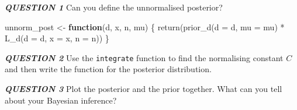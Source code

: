 \documentclass[
]{article}
\newenvironment{Shaded}{\begin{snugshade}}{\end{snugshade}}
\newcommand{\AttributeTok}[1]{\textcolor[rgb]{0.77,0.63,0.00}{#1}}
\newcommand{\ConstantTok}[1]{\textcolor[rgb]{0.00,0.00,0.00}{#1}}
\newcommand{\ControlFlowTok}[1]{\textcolor[rgb]{0.13,0.29,0.53}{\textbf{#1}}}
\newcommand{\DecValTok}[1]{\textcolor[rgb]{0.00,0.00,0.81}{#1}}
\newcommand{\FloatTok}[1]{\textcolor[rgb]{0.00,0.00,0.81}{#1}}
\newcommand{\FunctionTok}[1]{\textcolor[rgb]{0.00,0.00,0.00}{#1}}
\newcommand{\NormalTok}[1]{#1}
\newcommand{\OtherTok}[1]{\textcolor[rgb]{0.56,0.35,0.01}{#1}}
\newcommand{\SpecialCharTok}[1]{\textcolor[rgb]{0.00,0.00,0.00}{#1}}
\begin{document}
\emph{\textbf{QUESTION 1}} Can you define the unnormalised posterior?

\begin{Shaded}
\begin{Highlighting}[]
\NormalTok{unnorm\_post }\OtherTok{\textless{}{-}} \ControlFlowTok{function}\NormalTok{(d, x, n, mu)}
\NormalTok{\{}
  \FunctionTok{return}\NormalTok{(}\FunctionTok{prior\_d}\NormalTok{(}\AttributeTok{d =}\NormalTok{ d, }\AttributeTok{mu =}\NormalTok{ mu) }\SpecialCharTok{*} \FunctionTok{L\_d}\NormalTok{(}\AttributeTok{d =}\NormalTok{ d, }\AttributeTok{x =}\NormalTok{ x, }\AttributeTok{n =}\NormalTok{ n))}
\NormalTok{\}}
\end{Highlighting}
\end{Shaded}

\emph{\textbf{QUESTION 2}} Use the \texttt{integrate} function to find
the normalising constant \(C\) and then write the function for the
posterior distribution.

\begin{Shaded}
\end{Shaded}

\emph{\textbf{QUESTION 3}} Plot the posterior and the prior together.
What can you tell about your Bayesian inference?
\end{document}
